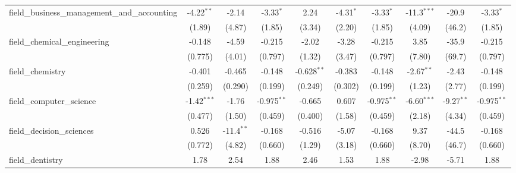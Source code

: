 \begin{tabular}{lccccccccc}
   field\_business\_management\_and\_accounting                & -4.22$^{**}$   & -2.14          & -3.33$^{*}$    & 2.24           & -4.31$^{*}$   & -3.33$^{*}$    & -11.3$^{***}$  & -20.9         & -3.33$^{*}$\\   
                                                               & (1.89)         & (4.87)         & (1.85)         & (3.34)         & (2.20)        & (1.85)         & (4.09)         & (46.2)        & (1.85)\\   
   field\_chemical\_engineering                                & -0.148         & -4.59          & -0.215         & -2.02          & -3.28         & -0.215         & 3.85           & -35.9         & -0.215\\   
                                                               & (0.775)        & (4.01)         & (0.797)        & (1.32)         & (3.47)        & (0.797)        & (7.80)         & (69.7)        & (0.797)\\   
   field\_chemistry                                            & -0.401         & -0.465         & -0.148         & -0.628$^{**}$  & -0.383        & -0.148         & -2.67$^{**}$   & -2.43         & -0.148\\   
                                                               & (0.259)        & (0.290)        & (0.199)        & (0.249)        & (0.302)       & (0.199)        & (1.23)         & (2.77)        & (0.199)\\   
   field\_computer\_science                                    & -1.42$^{***}$  & -1.76          & -0.975$^{**}$  & -0.665         & 0.607         & -0.975$^{**}$  & -6.60$^{***}$  & -9.27$^{**}$  & -0.975$^{**}$\\   
                                                               & (0.477)        & (1.50)         & (0.459)        & (0.400)        & (1.58)        & (0.459)        & (2.18)         & (4.34)        & (0.459)\\   
   field\_decision\_sciences                                   & 0.526          & -11.4$^{**}$   & -0.168         & -0.516         & -5.07         & -0.168         & 9.37           & -44.5         & -0.168\\   
                                                               & (0.772)        & (4.82)         & (0.660)        & (1.29)         & (3.18)        & (0.660)        & (8.70)         & (46.7)        & (0.660)\\   
   field\_dentistry                                            & 1.78           & 2.54           & 1.88           & 2.46           & 1.53          & 1.88           & -2.98          & -5.71         & 1.88\\   

\end{tabular}
